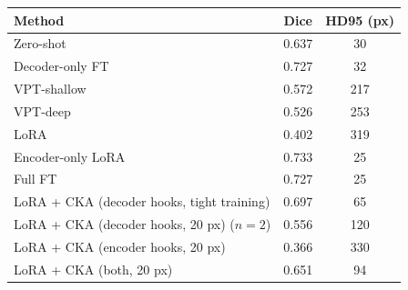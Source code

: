 \begin{tabular}{lcc}
\toprule
Method & Dice & HD95 (px) \\
\midrule
Zero-shot & 0.637 & 30 \\
Decoder-only FT & 0.727 & 32 \\
VPT-shallow & 0.572 & 217 \\
VPT-deep & 0.526 & 253 \\
LoRA & 0.402 & 319 \\
Encoder-only LoRA & 0.733 & 25 \\
Full FT & 0.727 & 25 \\
LoRA + CKA (decoder hooks, tight training) & 0.697 & 65 \\
LoRA + CKA (decoder hooks, 20 px) ($n=2$) & 0.556 & 120 \\
LoRA + CKA (encoder hooks, 20 px) & 0.366 & 330 \\
LoRA + CKA (both, 20 px) & 0.651 & 94 \\
\bottomrule
\end{tabular}
